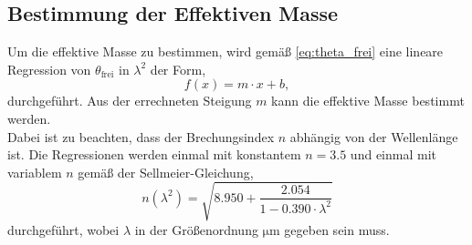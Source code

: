 \subsection{Bestimmung der Effektiven Masse}
Um die effektive Masse zu bestimmen, wird gemäß \autoref{eq:theta_frei} eine lineare Regression von $\theta_\text{frei}$ in $\lambda^2$ der Form,
\begin{equation}
    f(x)=m \cdot x+b,
    \label{eq:lineareform}
\end{equation}
durchgeführt. Aus der errechneten Steigung $m$ kann die effektive Masse bestimmt werden.\\
Dabei ist zu beachten, dass der Brechungsindex $n$ abhängig von der Wellenlänge ist. Die Regressionen werden einmal mit konstantem $n = \num{3,5}$
und einmal mit variablem $n$ gemäß der Sellmeier-Gleichung,
\begin{equation}
    n(\lambda^2) = \sqrt{\qty{8.950} + \frac{\qty{2.054}}{1 - \qty{0.390} \cdot \lambda^2}}
    \label{eq:sellmeier}
\end{equation}
durchgeführt, wobei $\lambda$ in der Größenordnung $\si{\micro\meter}$ gegeben sein muss.

